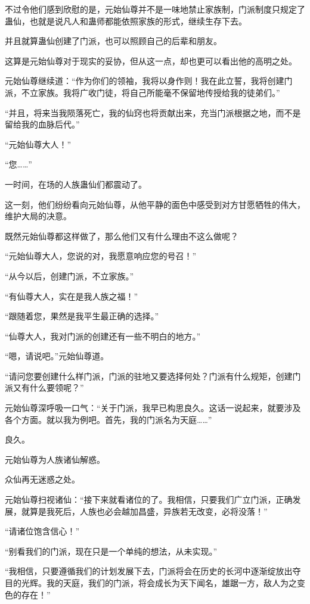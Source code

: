 \begin{this_body}
不过令他们感到欣慰的是，元始仙尊并不是一味地禁止家族制，门派制度只规定了蛊仙，也就是说凡人和蛊师都能依照家族的形式，继续生存下去。

并且就算蛊仙创建了门派，也可以照顾自己的后辈和朋友。

这算是元始仙尊对于现实的妥协，但从这一点，却也更可以看出他的高明之处。

元始仙尊继续道：“作为你们的领袖，我将以身作则！我在此立誓，我将创建门派，不立家族。我将广收门徒，将自己所能毫不保留地传授给我的徒弟们。”

“并且，将来当我陨落死亡，我的仙窍也将贡献出来，充当门派根据之地，而不是留给我的血脉后代。”

“元始仙尊大人！”

“您……”

一时间，在场的人族蛊仙们都震动了。

这一刻，他们纷纷看向元始仙尊，从他平静的面色中感受到对方甘愿牺牲的伟大，维护大局的决意。

既然元始仙尊都这样做了，那么他们又有什么理由不这么做呢？

“元始仙尊大人，您说的对，我愿意响应您的号召！”

“从今以后，创建门派，不立家族。”

“有仙尊大人，实在是我人族之福！”

“跟随着您，果然是我平生最正确的选择。”

“仙尊大人，我对门派的创建还有一些不明白的地方。”

“嗯，请说吧。”元始仙尊道。

“请问您要创建什么样门派，门派的驻地又要选择何处？门派有什么规矩，创建门派又有什么要领呢？”

元始仙尊深呼吸一口气：“关于门派，我早已构思良久。这话一说起来，就要涉及各个方面。就以我为例吧。首先，我的门派名为天庭……”

良久。

元始仙尊为人族诸仙解惑。

众仙再无迷惑之处。

元始仙尊扫视诸仙：“接下来就看诸位的了。我相信，只要我们广立门派，正确发展，就算是我死后，人族也必会越加昌盛，异族若无改变，必将没落！”

“请诸位饱含信心！”

“别看我们的门派，现在只是一个单纯的想法，从未实现。”

“我相信，只要遵循我们的计划发展下去，门派将会在历史的长河中逐渐绽放出夺目的光辉。我的天庭，我们的门派，将会成长为天下闻名，雄踞一方，敌人为之变色的存在！”


\end{this_body}
